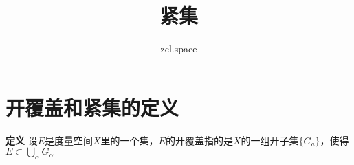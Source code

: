 \documentclass[10pt,a4paper,UTF8]{article}
\author{zcl.space}
\date{}
\title{紧集}
\begin{document}
\maketitle
\tableofcontents



\section{开覆盖和紧集的定义}
\label{sec:orgheadline1}


\textbf{定义} 设\(E\)是度量空间\(X\)里的一个集，\(E\)的开覆盖指的是\(X\)的一组开子集\(\{G_{a}\}\)，使得\(E\subset \bigcup\limits_{\alpha} G_{\alpha}\)
\end{document}

